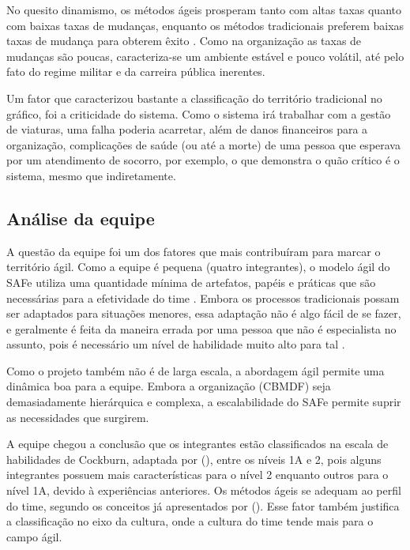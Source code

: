 	No quesito dinamismo, os métodos ágeis prosperam tanto com altas taxas quanto com baixas taxas de mudanças, enquanto
	os métodos tradicionais preferem baixas taxas de mudança para obterem êxito \cite{boehm}. Como na
	organização as taxas de mudanças são poucas, caracteriza-se um ambiente estável e pouco volátil, até pelo fato
	do regime militar e da carreira pública inerentes.
	
	Um fator que caracterizou bastante a classificação do território tradicional no gráfico, foi a criticidade do sistema.
	Como o sistema irá trabalhar com a gestão de viaturas, uma falha poderia acarretar, além de danos financeiros para a
	organização, complicações de saúde (ou até a morte) de uma pessoa que esperava por um atendimento de socorro,
	por exemplo, o que demonstra o quão crítico é o sistema, mesmo que indiretamente.
	
	
    \subsection{Análise da equipe}
	
	A questão da equipe foi um dos fatores que mais contribuíram para marcar o território ágil. Como a equipe é pequena
	(quatro integrantes), o modelo ágil do SAFe utiliza uma quantidade mínima de artefatos, papéis e práticas que são
	necessárias para a efetividade do time \cite{leffingwell11}. Embora os processos tradicionais possam ser adaptados
	para situações menores, essa adaptação não é algo fácil de se fazer, e geralmente é feita da maneira errada por uma
	pessoa que não é especialista no assunto, pois é necessário um nível de habilidade muito alto para tal
	\cite{boehm}.
	
	Como o projeto também não é de larga escala, a abordagem ágil permite uma dinâmica boa para a equipe.
	Embora a organização (CBMDF) seja demasiadamente hierárquica e complexa, a escalabilidade do SAFe permite suprir
	as necessidades que surgirem.
	
	A equipe chegou a conclusão que os integrantes estão classificados na escala de habilidades de Cockburn, adaptada
	por \citeauthor{boehm} (\citeyear{boehm}), entre os níveis 1A e 2, pois alguns integrantes possuem mais características para o
	nível 2 enquanto outros para o nível 1A, devido à experiências anteriores. Os métodos ágeis se adequam ao perfil
	do time, segundo os conceitos já apresentados por \citeauthor{boehm} (\citeyear{boehm}). Esse fator também justifica
	a classificação	no eixo da cultura, onde a cultura do time tende mais para o campo ágil.
	
